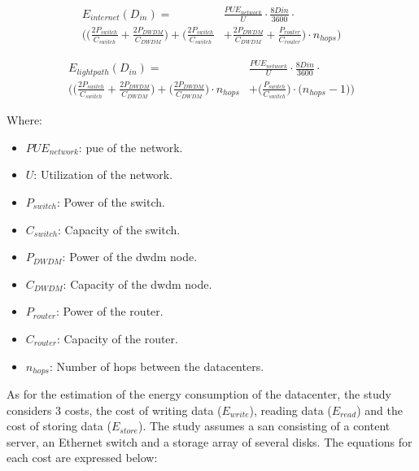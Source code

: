 \begin{equation}
\label{formula:tall_public_internet}
\begin{split}
    E_{internet}(D_{in}) = & \frac{PUE_{network}}{U} \cdot \frac{8D{in}}{3600} \cdot \\
    \Bigg( \bigg( \frac{2P_{switch}}{C_{switch}} + \frac{2P_{DWDM}}{C_{DWDM}} \bigg) + \bigg(\frac{2P_{switch}}{C_{switch}} & + \frac{2P_{DWDM}}{C_{DWDM}} + \frac{P_{router}}{C_{router}}\bigg) \cdot n_{hops} \Bigg)
\end{split}
\end{equation}

\begin{equation}
\label{formula:tall_lightpath}
\begin{split}
    E_{lightpath}(D_{in}) = & \frac{PUE_{network}}{U} \cdot \frac{8D{in}}{3600} \cdot \\
    \Bigg( \bigg( \frac{2P_{switch}}{C_{switch}} + \frac{2P_{DWDM}}{C_{DWDM}} \bigg) + \bigg(\frac{2P_{DWDM}}{C_{DWDM}}\bigg) \cdot n_{hops} & + \bigg( \frac{P_{switch}}{C_{switch}} \bigg) \cdot \bigg( n_{hops} - 1 \bigg) \Bigg)
\end{split}
\end{equation}

Where:

\begin{itemize}
    \item $PUE_{network}$: \ac{pue} of the network.
    \item $U$: Utilization of the network.
    \item $P_{switch}$: Power of the switch.
    \item $C_{switch}$: Capacity of the switch.
    \item $P_{DWDM}$: Power of the \ac{dwdm} node.
    \item $C_{DWDM}$: Capacity of the \ac{dwdm} node.
    \item $P_{router}$: Power of the router.
    \item $C_{router}$: Capacity of the router.
    \item $n_{hops}$: Number of hops between the datacenters.
\end{itemize}

As for the estimation of the energy consumption of the datacenter, the study considers 3 costs, the cost of writing data ($E_{write}$), reading data ($E_{read}$) and the cost of storing data ($E_{store}$). The study assumes a \ac{san} consisting of a content server, an Ethernet switch and a storage array of several disks. The equations for each cost are expressed below:

